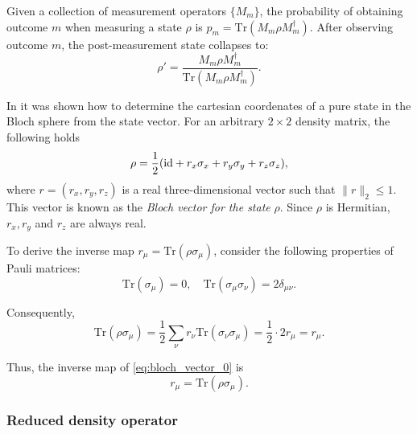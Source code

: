 \begin{definition}
  Given a collection of measurement operators \( \{M_m\} \), the probability of obtaining outcome \( m \) when measuring a state \( \rho \) is $p_m = \text{Tr}(M_m \rho M_m^\dagger).$
  After observing outcome $ m $, the post-measurement state collapses to:
  \[
  \rho' = \frac{M_m \rho M_m^\dagger}{\text{Tr}(M_m \rho M_m^\dagger)}.
  \]
\end{definition}


\begin{definition}
  In  it was shown how to determine the cartesian coordenates of a pure state in the Bloch sphere from the state vector. For an arbitrary $2 \times 2$ density matrix, the following holds
\begin{equation} \label{eq:bloch_vector_0}
  \rho = \frac{1}{2}(\mathrm{id} + r_{x}\sigma_{x} + r_{y}\sigma_{y} + r_{z}\sigma_{z}),
\end{equation}
where $r = (r_x, r_y, r_z)$ is a real three-dimensional vector such that $\| r \|_2 \leq 1$. This vector is known as the \emph{Bloch vector for the state} $\rho$. Since $\rho$ is Hermitian, $r_x, r_y$ and $r_z$ are always real.  

To derive the inverse map \( r_\mu = \text{Tr}(\rho \sigma_\mu) \), consider the following properties of Pauli matrices:
\[
\text{Tr}(\sigma_\mu) = 0, \quad \text{Tr}(\sigma_\mu \sigma_\nu) = 2 \delta_{\mu \nu}.
\]

Consequently,
\[
\text{Tr}(\rho \sigma_\mu) = \frac{1}{2} \sum_{\nu} r_\nu \text{Tr}(\sigma_\nu \sigma_\mu) = \frac{1}{2} \cdot 2 r_\mu = r_\mu.
\]

Thus, the inverse map of \autoref{eq:bloch_vector_0} is
\begin{equation*}
  \label{eq:Bloch_vector}
  r_{\mu} = \text{Tr}(\rho \sigma_{\mu}).
  \end{equation*} 
\end{definition}



\subsubsection{Reduced density operator}

